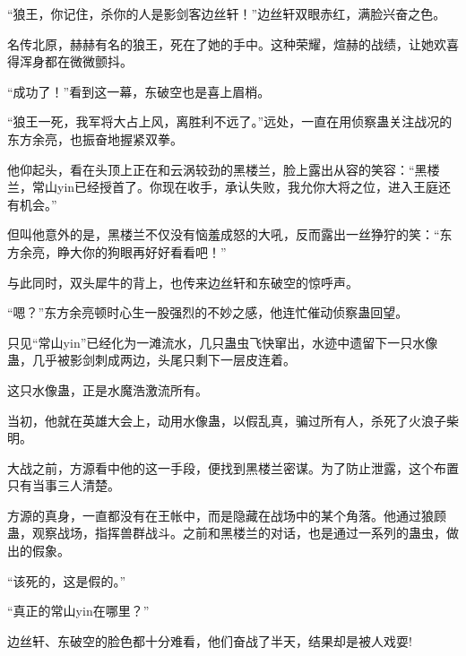 \begin{this_body}
“狼王，你记住，杀你的人是影剑客边丝轩！”边丝轩双眼赤红，满脸兴奋之色。

名传北原，赫赫有名的狼王，死在了她的手中。这种荣耀，煊赫的战绩，让她欢喜得浑身都在微微颤抖。

“成功了！”看到这一幕，东破空也是喜上眉梢。

“狼王一死，我军将大占上风，离胜利不远了。”远处，一直在用侦察蛊关注战况的东方余亮，也振奋地握紧双拳。

他仰起头，看在头顶上正在和云涡较劲的黑楼兰，脸上露出从容的笑容：“黑楼兰，常山yin已经授首了。你现在收手，承认失败，我允你大将之位，进入王庭还有机会。”

但叫他意外的是，黑楼兰不仅没有恼羞成怒的大吼，反而露出一丝狰狞的笑：“东方余亮，睁大你的狗眼再好好看看吧！”

与此同时，双头犀牛的背上，也传来边丝轩和东破空的惊呼声。

“嗯？”东方余亮顿时心生一股强烈的不妙之感，他连忙催动侦察蛊回望。

只见“常山yin”已经化为一滩流水，几只蛊虫飞快窜出，水迹中遗留下一只水像蛊，几乎被影剑刺成两边，头尾只剩下一层皮连着。

这只水像蛊，正是水魔浩激流所有。

当初，他就在英雄大会上，动用水像蛊，以假乱真，骗过所有人，杀死了火浪子柴明。

大战之前，方源看中他的这一手段，便找到黑楼兰密谋。为了防止泄露，这个布置只有当事三人清楚。

方源的真身，一直都没有在王帐中，而是隐藏在战场中的某个角落。他通过狼顾蛊，观察战场，指挥兽群战斗。之前和黑楼兰的对话，也是通过一系列的蛊虫，做出的假象。

“该死的，这是假的。”

“真正的常山yin在哪里？”

边丝轩、东破空的脸色都十分难看，他们奋战了半天，结果却是被人戏耍!

\end{this_body}

